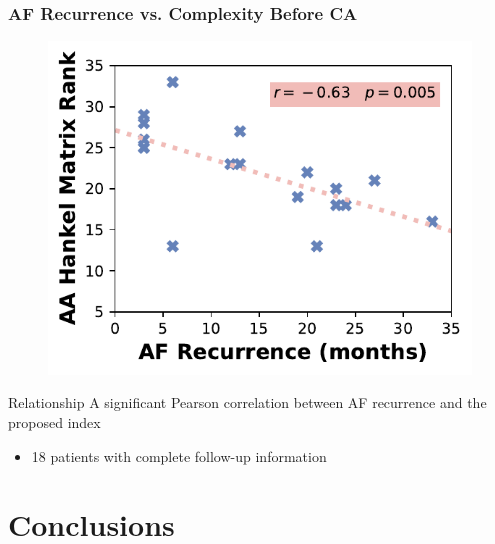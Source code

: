 \documentclass{beamer}
\begin{document}
	\begin{frame}
		\frametitle{AF Recurrence vs. Complexity Before CA} 
		
		\vspace{-0.3cm}
		\begin{figure}[h]
			\centering
			\includegraphics[scale=0.7]{rank_LR.pdf}
		\end{figure}
		\vspace{-0.5cm}
		\begin{block}{Relationship}
			A significant Pearson correlation between AF recurrence and the proposed index
			\begin{itemize}
				\item 18 patients with complete follow-up information
			\end{itemize}
		\end{block}	
	\end{frame}

\section{Conclusions}
\end{document}
